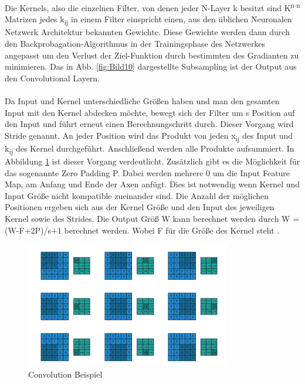 \documentclass{llncs}
\begin{document}
Die Kernels, also die einzelnen Filter, von denen jeder N-Layer k besitzt sind K\textsuperscript{n$\cdot$n} Matrizen jedes k\textsubscript{ij} in einem Filter einspricht einen, aus den üblichen Neuronalen Netzwerk Architektur bekannten Gewichte. Diese Gewichte werden dann durch den Backprobagation-Algorithmus in der Trainingsphase des Netzwerkes angepasst um den Verlust der Ziel-Funktion durch bestimmten des Gradianten zu minimieren. Das in Abb. \ref{fig:Bild10} dargestellte Subsampling ist der Output aus den Convolutional Layern\cite{Grundlagen}. 
\\\\
Da Input und Kernel unterschiedliche Größen haben und man den gesamten Input mit den Kernel abdecken möchte, bewegt sich der Filter um s Position auf den Input und führt erneut einen Berechnungschritt durch. Dieser Vorgang wird Stride genannt. An jeder Position wird das Produkt von jeden x\textsubscript{ij} des Input und k\textsubscript{ij} des Kernel durchgeführt.  Anschließend werden alle Produkte aufsummiert. In Abbildung \ref{fig:Bild11} ist dieser Vorgang verdeutlicht. Zusätzlich gibt es die Möglichkeit für das sogenannte Zero Padding P. Dabei werden mehrere 0 um die Input Feature Map, am Anfang und Ende der Axen anfügt. Dies ist notwendig wenn Kernel und Input Größe nicht kompatible zueinander sind. Die Anzahl der möglichen Positionen ergeben sich aus der Kernel Größe und den Input des jeweiligen Kernel sowie des Strides. Die Output Größ W kann berechnet werden durch W = (W-F+2P)/s+1 berechnet werden. Wobei F für die Größe des Kernel steht \cite{conv}.
\newpage
\begin{figure}
	\centering
	\includegraphics[width=0.8\textwidth]{conv.png}
	\caption{Convolution Beispiel\protect\cite{conv}}
	\label{fig:Bild11}
\end{figure}
\end{document}
